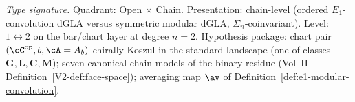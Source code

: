 \begin{proposition}
\label{prop:hdm-averaging-compatibility}
\emph{Type signature.} Quadrant: Open $\times$ Chain. Presentation:
chain-level (ordered $E_1$-convolution dGLA versus symmetric modular
dGLA, $\Sigma_n$-coinvariant). Level: $1\leftrightarrow 2$ on the
bar/chart layer at degree $n=2$. Hypothesis package: chart pair
$(\cC^{\mathrm{op}}, b, \cA = A_b)$ chirally Koszul in the standard
landscape (one of classes $\mathbf{G}, \mathbf{L}, \mathbf{C},
\mathbf{M}$); seven canonical chain models of the binary residue
(Vol~II Definition~\textup{\ref{V2-def:face-space}}); averaging map
$\av$ of Definition~\textup{\ref{def:e1-modular-convolution}}.


\end{proposition}
